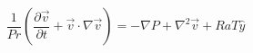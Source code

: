 \documentclass[preview]{standalone}
\begin{document}
\setcounter{equation}{0}
\begin{equation}
\frac{1}{Pr} \left( \frac{\partial \vec{v}}{\partial t} + \vec{v} \cdot \nabla \vec{v} \right) =
    - \nabla P + \nabla^2 \vec{v} + Ra T \hat{y}
\end{equation}
\end{document}
